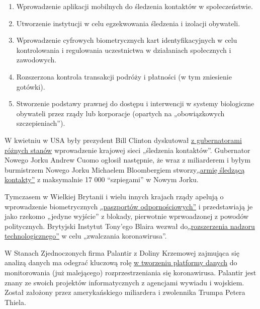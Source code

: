 \begin{enumerate}
\def\labelenumi{\arabic{enumi}.}
\tightlist
\item
  Wprowadzenie aplikacji mobilnych do śledzenia kontaktów w
  społeczeństwie.
\item
  Utworzenie instytucji w celu egzekwowania śledzenia i izolacji
  obywateli.
\item
  Wprowadzenie cyfrowych biometrycznych kart identyfikacyjnych w celu
  kontrolowania i regulowania uczestnictwa w działaniach społecznych i
  zawodowych.
\item
  Rozszerzona kontrola transakcji podróży i płatności (w tym zniesienie
  gotówki).
\item
  Stworzenie podstawy prawnej do dostępu i interwencji w systemy
  biologiczne obywateli przez rządy lub korporacje (opartych na
  „obowiązkowych szczepieniach'').
\end{enumerate}

W kwietniu w USA były prezydent Bill Clinton dyskutował
\href{https://www.youtube.com/watch?v=-Ug9XHT9JQQ}{z gubernatorami
różnych stanów} wprowadzenie krajowej sieci „śledzenia kontaktów''.
Gubernator Nowego Jorku Andrew Cuomo ogłosił następnie, że wraz z
miliarderem i byłym burmistrzem Nowego Jorku Michaelem Bloombergiem
stworzy\href{https://www.cbsnews.com/news/contact-tracing-new-york-cuomo-plan/}{„armię
śledzącą kontakty''} z maksymalnie 17 000 ``szpiegami'' w Nowym Jorku.

Tymczasem w Wielkiej Brytanii i wielu innych krajach rządy apelują o
wprowadzenie biometrycznych
\href{https://www.msn.com/en-us/money/news/the-uk-just-published-blueprints-for-covid-19-immunity-passports-a-controversial-potential-route-out-of-lockdown/ar-BB13qr8L}{„paszportów
odpornościowych''} i przedstawiają je jako rzekomo „jedyne wyjście'' z
blokady, pierwotnie wprwoadzonej z powodów politycznych. Brytyjski
Instytut Tony'ego Blaira wezwał
do\href{https://www.theguardian.com/world/2020/apr/24/surveillance-a-price-worth-paying-to-beat-coronavirus-says-blair-thinktank}{„rozszerzenia
nadzoru technologicznego''} w celu „zwalczania koronawirusa''.

W Stanach Zjednoczonych firma Palantir z Doliny Krzemowej zajmująca się
analizą danych ma odegrać kluczową rolę
\href{https://www.msn.com/en-us/news/us/team-trump-turns-to-peter-thiel-s-palantir-to-track-virus/ar-BB130qfE}{w
tworzeniu platformy danych} do monitorowania (już malejącego)
rozprzestrzeniania się koronawirusa. Palantir jest znany ze swoich
projektów informatycznych z agencjami wywiadu i wojskiem. Został
założony przez amerykańskiego miliardera i zwolennika Trumpa Petera
Thiela.


